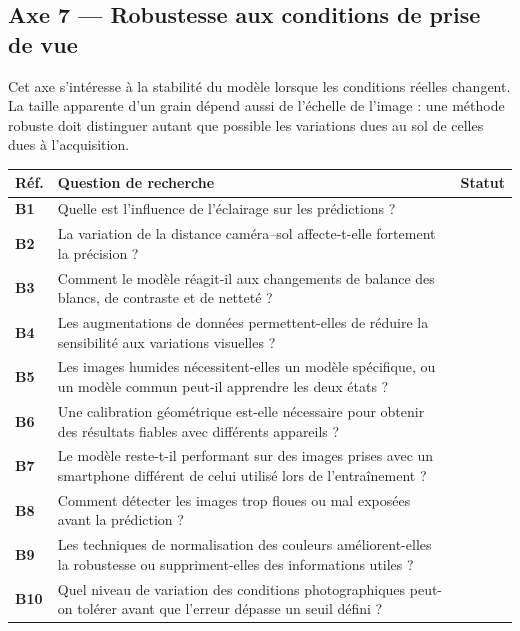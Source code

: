 \documentclass[11pt,a4paper]{article}
\makeatletter
\newenvironment{qtable}{%
  \par\smallskip
  \begin{longtable}{@{}>{\bfseries}p{1.0cm} p{12.3cm} p{1.5cm}@{}}
  \toprule
  \textbf{Réf.} & \textbf{Question de recherche} & \textbf{Statut}\\
  \midrule
  \endhead
}{%
  \bottomrule
  \end{longtable}
}
\makeatother
\begin{document}
\subsection*{Axe 7 --- Robustesse aux conditions de prise de vue}
Cet axe s'intéresse à la stabilité du modèle lorsque les conditions réelles changent. La taille apparente d'un grain dépend aussi de l'échelle de l'image : une méthode robuste doit distinguer autant que possible les variations dues au sol de celles dues à l'acquisition.
\begin{qtable}
B1 & Quelle est l'influence de l'éclairage sur les prédictions ? & \\
B2 & La variation de la distance caméra--sol affecte-t-elle fortement la précision ? & \\
B3 & Comment le modèle réagit-il aux changements de balance des blancs, de contraste et de netteté ? & \\
B4 & Les augmentations de données permettent-elles de réduire la sensibilité aux variations visuelles ? & \\
B5 & Les images humides nécessitent-elles un modèle spécifique, ou un modèle commun peut-il apprendre les deux états ? & \\
B6 & Une calibration géométrique est-elle nécessaire pour obtenir des résultats fiables avec différents appareils ? & \\
B7 & Le modèle reste-t-il performant sur des images prises avec un smartphone différent de celui utilisé lors de l'entraînement ? & \\
B8 & Comment détecter les images trop floues ou mal exposées avant la prédiction ? & \\
B9 & Les techniques de normalisation des couleurs améliorent-elles la robustesse ou suppriment-elles des informations utiles ? & \\
B10 & Quel niveau de variation des conditions photographiques peut-on tolérer avant que l'erreur dépasse un seuil défini ? & \\
\end{qtable}
\end{document}
